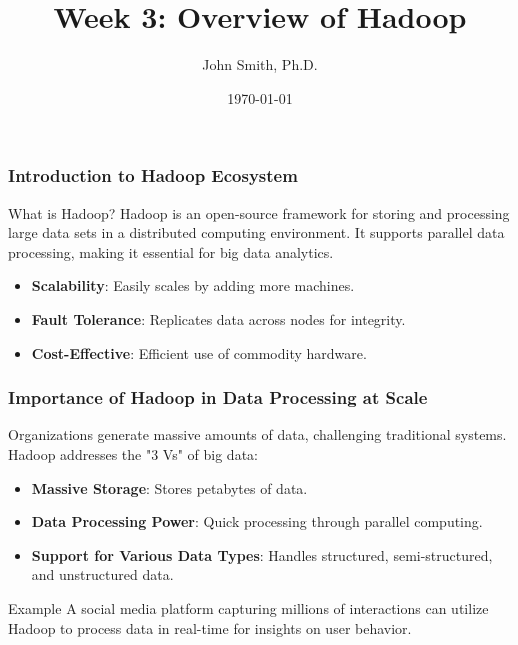 \documentclass[aspectratio=169]{beamer}
\title[Hadoop Overview]{Week 3: Overview of Hadoop}
\author[J. Smith]{John Smith, Ph.D.}
\institute[University Name]{
  Department of Computer Science\\
  University Name\\
  \vspace{0.3cm}
  Email: email@university.edu\\
  Website: www.university.edu
}
\date{\today}
\begin{document}
\frame{\titlepage}

\begin{frame}[fragile]
    \frametitle{Introduction to Hadoop Ecosystem}
    \begin{block}{What is Hadoop?}
        Hadoop is an open-source framework for storing and processing large data sets in a distributed computing environment. It supports parallel data processing, making it essential for big data analytics.
    \end{block}
    
    \begin{itemize}
        \item \textbf{Scalability}: Easily scales by adding more machines.
        \item \textbf{Fault Tolerance}: Replicates data across nodes for integrity.
        \item \textbf{Cost-Effective}: Efficient use of commodity hardware.
    \end{itemize}
\end{frame}

\begin{frame}[fragile]
    \frametitle{Importance of Hadoop in Data Processing at Scale}
    
    Organizations generate massive amounts of data, challenging traditional systems. Hadoop addresses the "3 Vs" of big data:
    
    \begin{itemize}
        \item \textbf{Massive Storage}: Stores petabytes of data.
        \item \textbf{Data Processing Power}: Quick processing through parallel computing.
        \item \textbf{Support for Various Data Types}: Handles structured, semi-structured, and unstructured data.
    \end{itemize}
    
    \begin{block}{Example}
        A social media platform capturing millions of interactions can utilize Hadoop to process data in real-time for insights on user behavior.
    \end{block}
\end{frame}
\end{document}
